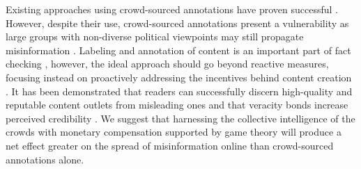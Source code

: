 \documentclass{article}
\begin{document}
Existing approaches using crowd-sourced annotations \cite{community-notes, birdwatch} have proven successful \cite{annotation-effectiveness}. However, despite their use, crowd-sourced annotations present a vulnerability as large groups with non-diverse political viewpoints may still propagate misinformation \cite{diversity-in-skeptical-views, bellingcat-taylor-swift}. Labeling and annotation of content is an important part of fact checking \cite{effectiveness-of-warning-labels}, however, the ideal approach should go beyond reactive measures, focusing instead on proactively addressing the incentives behind content creation \cite{annotation-effectiveness}. It has been demonstrated that readers can successfully discern high-quality and reputable content outlets from misleading ones \cite{pennycook-crowdsourced-solution} and that veracity bonds increase perceived credibility \cite{barbosa2025}. We suggest that harnessing the collective intelligence of the crowds with monetary compensation \cite{monetary-incentives} supported by game theory \cite{game-theoretic-incentives:2016, game-theoretic-short-long-term:2020, game-theoretic-large-stakes:2015, game-theoretic-mobile-networks:2012} will produce a net effect greater on the spread of misinformation online than crowd-sourced annotations alone.



\end{document}
